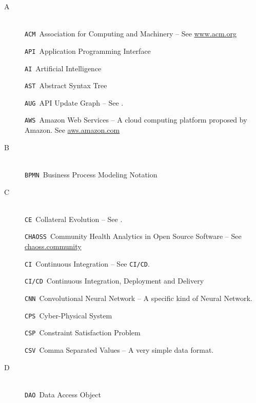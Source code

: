 %
%



\begin{description}%

\item[A]~\\
\verb|ACM|\quad~Association for Computing and Machinery -- See \url{www.acm.org}

\verb|API|\quad~Application Programming Interface

\verb|AI|\quad~Artificial Intelligence

\verb|AST|\quad~Abstract Syntax Tree

\verb|AUG|\quad~API Update Graph -- See .

\verb|AWS|\quad~Amazon Web Services -- A cloud computing platform proposed by Amazon. See \url{aws.amazon.com}

\item[B]~\\
\verb|BPMN|\quad~Business Process Modeling Notation


\item[C]~\\
\verb|CE|\quad~Collateral Evolution -- See .

\verb|CHAOSS|\quad~Community Health Analytics in Open Source Software -- See \url{chaoss.community}

\verb|CI|\quad~Continuous Integration -- See \verb|CI/CD|.

\verb|CI/CD|\quad~Continuous Integration, Deployment and Delivery

\verb|CNN|\quad~Convolutional Neural Network -- A specific kind of Neural Network. %

\verb|CPS|\quad~Cyber-Physical System

\verb|CSP|\quad~Constraint Satisfaction Problem

\verb|CSV|\quad~Comma Separated Values -- A very simple data format.


\item[D]~\\
\verb|DAO|\quad~Data Access Object


\end{description}
